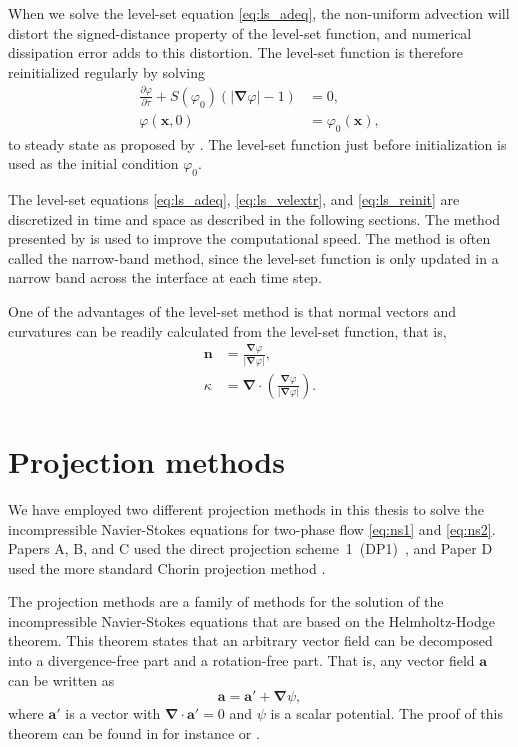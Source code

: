 \documentclass[11pt,b5paper,DIV=calc,BCOR1.3cm,headings=small,%
               footinclude=false,headsepline]{scrbook}
\newcommand*{\pd}[2]{\ensuremath{\frac{\partial #1}{\partial{#2}}}}
\newcommand*{\vct}[1]{\ensuremath{\boldsymbol{#1}}}
\newcommand*{\del}{\boldsymbol\nabla}
\renewcommand*{\div}{\del\cdot}
\newcommand*{\grad}{\del}
\begin{document}
When we solve the level-set equation \eqref{eq:ls_adeq}, the non-uniform
advection will distort the signed-distance property of the level-set function,
and numerical dissipation error adds to this distortion.  The level-set
function is therefore reinitialized regularly by solving
\begin{equation}
  \label{eq:ls_reinit}
  \begin{split}
    \pd{\varphi}{\tau} + S(\varphi_0)(|\grad\varphi|-1) &= 0, \\
    \varphi(\vct x,0) &= \varphi_0(\vct x),
  \end{split}
\end{equation}
to steady state as proposed by \citet{Sussman94}.  The level-set function just
before initialization is used as the initial condition $\varphi_0$.

The level-set equations \eqref{eq:ls_adeq}, \eqref{eq:ls_velextr}, and
\eqref{eq:ls_reinit} are discretized in time and space as described in the
following sections.  The method presented by \citet{Adalsteinsson95} is used to
improve the computational speed.  The method is often called the narrow-band
method, since the level-set function is only updated in a narrow band across
the interface at each time step.

One of the advantages of the level-set method is that normal vectors and
curvatures can be readily calculated from the level-set function, that is,
\begin{align}
  \label{eq:norm}
  \vct n &= \frac{\grad\varphi}{|\grad\varphi|}, \\
  \label{eq:curv}
  \kappa &= \div\left(\frac{\grad\varphi}{|\grad\varphi|}\right).
\end{align}

\section{Projection methods}
\label{sec:projection-method}
We have employed two different projection methods in this thesis to solve the
incompressible Navier-Stokes equations for two-phase flow \eqref{eq:ns1} and
\eqref{eq:ns2}.  Papers A, B, and C used the direct projection
scheme~1~(DP1)~\cite{Hansen05}, and Paper D used the more standard Chorin
projection method \cite{Chorin68}.

The projection methods are a family of methods for the solution of the
incompressible Navier-Stokes equations that are based on the Helmholtz-Hodge
theorem.  This theorem states that an arbitrary vector field can be decomposed
into a divergence-free part and a rotation-free part.  That is, any vector
field $\vct a$ can be written as
\begin{equation}
  \vct a = \vct a' + \grad\psi,
\end{equation}
where $\vct a'$ is a vector with $\div\vct a' = 0$ and $\psi$ is a scalar
potential.  The proof of this theorem can be found in for instance
\cite[§3.44]{Aris89} or \cite{Chorin00}.
\end{document}
